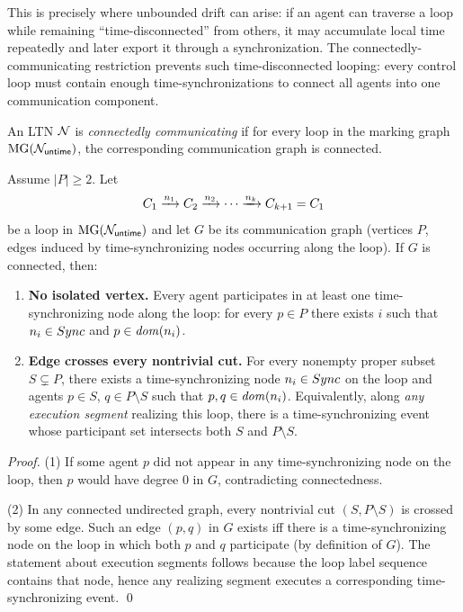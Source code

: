 This is precisely where unbounded drift can arise: if an agent can traverse a loop while remaining ``time-disconnected'' from others, it may accumulate local time repeatedly and later export it through a synchronization. The connectedly-communicating restriction prevents such time-disconnected looping: every control loop must contain enough time-synchronizations to connect all agents into one communication component.

\begin{definition}
An LTN $\mathcal{N}$ is \emph{connectedly communicating} if for every loop in the marking graph $\operatorname{MG}(\mathcal{N}_{\mathsf{untime}})$, the corresponding communication graph is connected.
\end{definition}

\begin{lemma}\label{lem:cc-cut}
Assume $|P|\ge 2$.
Let
\[
C_1 \xrightarrow{n_1} C_2 \xrightarrow{n_2} \cdots \xrightarrow{n_k} C_{k+1}=C_1
\]
be a loop in $\operatorname{MG}(\mathcal{N}_{\mathsf{untime}})$ and let $G$ be its communication graph (vertices $P$, edges induced by
time-synchronizing nodes occurring along the loop).
If $G$ is connected, then:
\begin{enumerate}
    \item \textbf{No isolated vertex.} Every agent participates in at least one time-synchronizing node along the loop:
    for every $p\in P$ there exists $i$ such that $n_i\in Sync$ and $p\in\mathit{dom}(n_i)$.
    \item \textbf{Edge crosses every nontrivial cut.} For every nonempty proper subset $S\subsetneq P$, there exists
    a time-synchronizing node $n_i\in Sync$ on the loop and agents $p\in S$, $q\in P\setminus S$ such that
    $p,q\in\mathit{dom}(n_i)$.
    Equivalently, along \emph{any execution segment} realizing this loop, there is a time-synchronizing event whose
    participant set intersects both $S$ and $P\setminus S$.
\end{enumerate}
\end{lemma}

\begin{proof}
(1) If some agent $p$ did not appear in any time-synchronizing node on the loop, then $p$ would have degree $0$ in $G$,
contradicting connectedness.

(2) In any connected undirected graph, every nontrivial cut $(S,P\setminus S)$ is crossed by some edge.
Such an edge $(p,q)$ in $G$ exists iff there is a time-synchronizing node on the loop in which both $p$ and $q$
participate (by definition of $G$). The statement about execution segments follows because the loop label sequence
contains that node, hence any realizing segment executes a corresponding time-synchronizing event. \qed
\end{proof}

